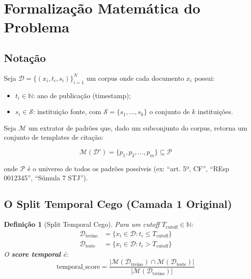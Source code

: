 \documentclass[12pt,a4paper]{article}
\newtheorem{defi}{Definição}[section]
\theoremstyle{remark}
\begin{document}
\newpage

\section{Formalização Matemática do Problema}

\subsection{Notação}

Seja $\mathcal{D} = \{(x_i, t_i, s_i)\}_{i=1}^{N}$ um corpus onde cada documento $x_i$ possui:
\begin{itemize}[nosep]
  \item $t_i \in \mathbb{N}$: ano de publicação (timestamp);
  \item $s_i \in \mathcal{S}$: instituição fonte, com $\mathcal{S} = \{s_1, \ldots, s_k\}$ o conjunto de $k$ instituições.
\end{itemize}

Seja $\mathcal{M}$ um extrator de padrões que, dado um subconjunto do corpus, retorna um conjunto de templates de citação:

\begin{equation}
\mathcal{M}(\mathcal{D}') = \{p_1, p_2, \ldots, p_m\} \subseteq \mathcal{P}
\end{equation}

onde $\mathcal{P}$ é o universo de todos os padrões possíveis (ex: ``art. 5º, CF'', ``REsp 0012345'', ``Súmula 7 STJ'').

\subsection{O Split Temporal Cego (Camada 1 Original)}

\begin{defi}[Split Temporal Cego]
Para um cutoff $T_{\text{cutoff}} \in \mathbb{N}$:
\begin{align}
\mathcal{D}_{\text{treino}} &= \{x_i \in \mathcal{D} : t_i \leq T_{\text{cutoff}}\} \\
\mathcal{D}_{\text{teste}}  &= \{x_i \in \mathcal{D} : t_i > T_{\text{cutoff}}\}
\end{align}
O \textbf{score temporal} é:
\begin{equation}
\text{temporal\_score} = \frac{|\mathcal{M}(\mathcal{D}_{\text{treino}}) \cap \mathcal{M}(\mathcal{D}_{\text{teste}})|}
                                {|\mathcal{M}(\mathcal{D}_{\text{treino}})|}
\end{equation}
\end{defi}
\end{document}
